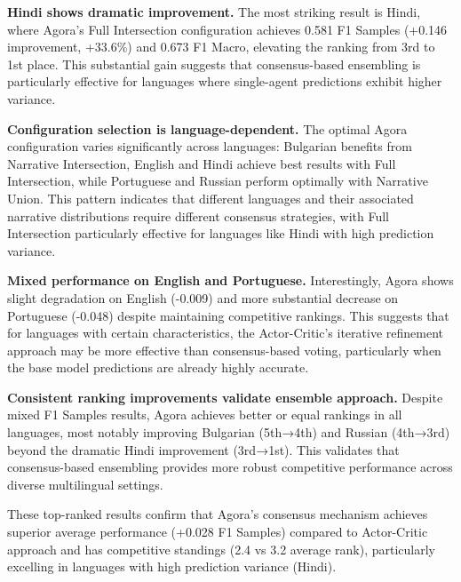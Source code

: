 \textbf{Hindi shows dramatic improvement.} The most striking result is Hindi, where Agora's Full Intersection configuration achieves 0.581 F1 Samples (+0.146 improvement, +33.6\%) and 0.673 F1 Macro, elevating the ranking from 3rd to 1st place. This substantial gain suggests that consensus-based ensembling is particularly effective for languages where single-agent predictions exhibit higher variance.

\textbf{Configuration selection is language-dependent.} The optimal Agora configuration varies significantly across languages: Bulgarian benefits from Narrative Intersection, English and Hindi achieve best results with Full Intersection, while Portuguese and Russian perform optimally with Narrative Union. This pattern indicates that different languages and their associated narrative distributions require different consensus strategies, with Full Intersection particularly effective for languages like Hindi with high prediction variance.

\textbf{Mixed performance on English and Portuguese.} Interestingly, Agora shows slight degradation on English (-0.009) and more substantial decrease on Portuguese (-0.048) despite maintaining competitive rankings. This suggests that for languages with certain characteristics, the Actor-Critic's iterative refinement approach may be more effective than consensus-based voting, particularly when the base model predictions are already highly accurate.

\textbf{Consistent ranking improvements validate ensemble approach.} Despite mixed F1 Samples results, Agora achieves better or equal rankings in all languages, most notably improving Bulgarian (5th→4th) and Russian (4th→3rd) beyond the dramatic Hindi improvement (3rd→1st). This validates that consensus-based ensembling provides more robust competitive performance across diverse multilingual settings.

These top-ranked results confirm that Agora's consensus mechanism achieves superior average performance (+0.028 F1 Samples) compared to Actor-Critic approach and has competitive standings (2.4 vs 3.2 average rank), particularly excelling in languages with high prediction variance (Hindi).


